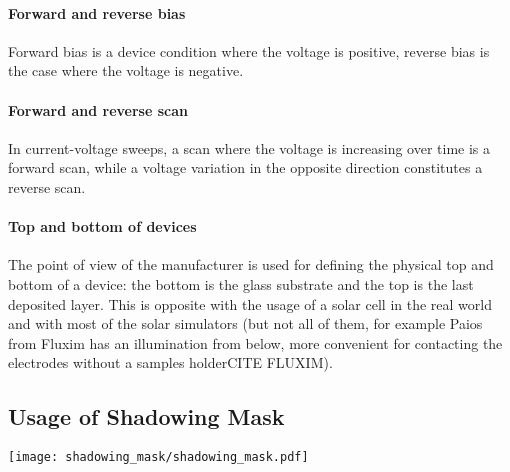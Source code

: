 \paragraph{Forward and reverse bias} Forward bias is a device condition where the voltage is positive, reverse bias is the case where the voltage is negative.

\paragraph{Forward and reverse scan} In current-voltage sweeps, a scan where the voltage is increasing over time is a forward scan, while a voltage variation in the opposite direction constitutes a reverse scan.

\paragraph{Top and bottom of devices} The point of view of the manufacturer is used for defining the physical top and bottom of a device: the bottom is the glass substrate and the top is the last deposited layer. This is opposite with the usage of a solar cell in the real world and with most of the solar simulators (but not all of them, for example Paios from Fluxim has an illumination from below, more convenient for contacting the electrodes without a samples holderCITE FLUXIM).

\subsection{Usage of Shadowing Mask}

\begin{SCfigure}
	\centering
	\texttt{[image: shadowing\_mask/shadowing\_mask.pdf]}
	\label{fig:shadowing_mask}
\end{SCfigure}

